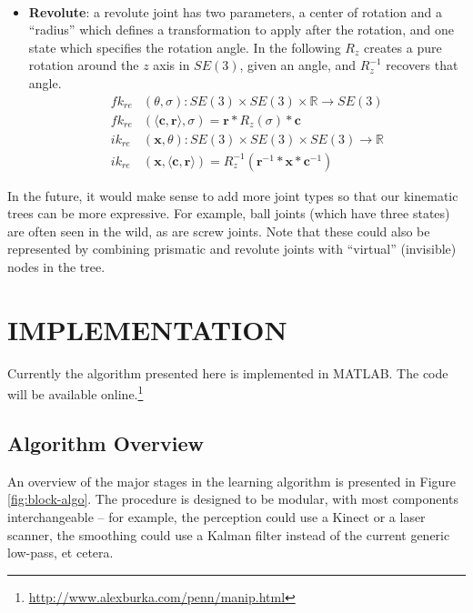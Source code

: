 \documentclass[letterpaper, 10 pt, conference]{ieeeconf}  %
\def\xse{\bm}            \def\xsestr{in boldface}
\begin{document}
\begin{itemize}
\begin{align}
    \end{align}
  \item \textbf{Revolute}: a revolute joint has two parameters, a center of rotation and a ``radius'' which defines a transformation to apply after the rotation, and one state which specifies the rotation angle. In the following $R_z$ creates a pure rotation around the $z$ axis in $SE(3)$, given an angle, and $R_z^{-1}$ recovers that angle.
    \begin{align}
      fk_{re}&(\theta, \sigma) : SE(3) \times SE(3) \times \mathbb{R} \longrightarrow SE(3) \\
      fk_{re}&(\langle \xse{c}, \xse{r} \rangle, \sigma) = \xse{r} * R_z(\sigma) * \xse{c} \nonumber\\
      ik_{re}&(\xse{x}, \theta) : SE(3) \times SE(3) \times SE(3) \longrightarrow \mathbb{R} \\
      ik_{re}&(\xse{x}, \langle \xse{c}, \xse{r} \rangle) = R_z^{-1}(\xse{r}^{-1}*\xse{x}*\xse{c}^{-1}) \nonumber
    \end{align}
\end{itemize}

In the future, it would make sense to add more joint types so that our kinematic trees can be more expressive. For example, ball joints (which have three states) are often seen in the wild, as are screw joints. Note that these could also be represented by combining prismatic and revolute joints with ``virtual'' (invisible) nodes in the tree.

\section{IMPLEMENTATION} \label{sec:implementation}
Currently the algorithm presented here is implemented in MATLAB. The code will be available online.\footnote{\url{http://www.alexburka.com/penn/manip.html}}

\subsection{Algorithm Overview} \label{sec:algorithm}
An overview of the major stages in the learning algorithm is presented in Figure \ref{fig:block-algo}. The procedure is designed to be modular, with most components interchangeable -- for example, the perception could use a Kinect or a laser scanner, the smoothing could use a Kalman filter instead of the current generic low-pass, et cetera.
\end{document}
